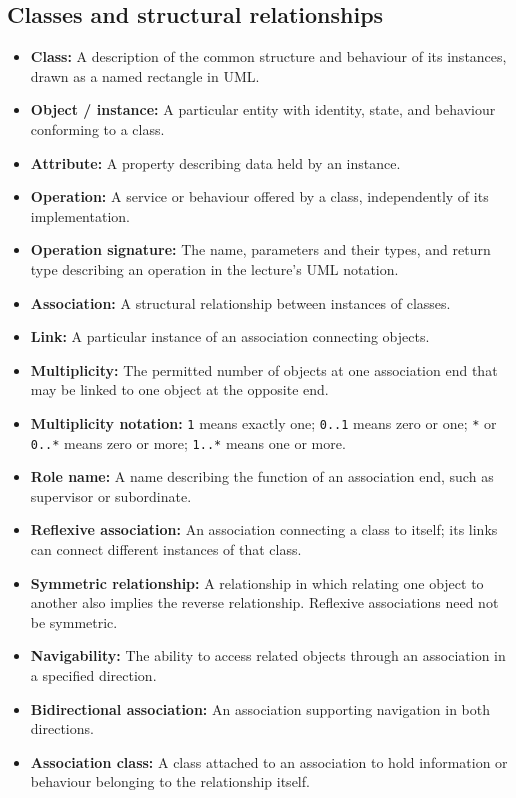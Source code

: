 \documentclass[11pt]{article}
\newenvironment{DottedList}{%
  \begin{itemize}[leftmargin=2em, itemsep=0.35em, topsep=0.35em, label=\textbullet]
}{%
  \end{itemize}
}
\begin{document}
\subsection*{Classes and structural relationships}
\begin{DottedList}
  \item \textbf{Class:} A description of the common structure and behaviour of its instances, drawn as a named rectangle in UML.
  \item \textbf{Object / instance:} A particular entity with identity, state, and behaviour conforming to a class.
  \item \textbf{Attribute:} A property describing data held by an instance.
  \item \textbf{Operation:} A service or behaviour offered by a class, independently of its implementation.
  \item \textbf{Operation signature:} The name, parameters and their types, and return type describing an operation in the lecture's UML notation.
  \item \textbf{Association:} A structural relationship between instances of classes.
  \item \textbf{Link:} A particular instance of an association connecting objects.
  \item \textbf{Multiplicity:} The permitted number of objects at one association end that may be linked to one object at the opposite end.
  \item \textbf{Multiplicity notation:} \texttt{1} means exactly one; \texttt{0..1} means zero or one; \texttt{*} or \texttt{0..*} means zero or more; \texttt{1..*} means one or more.
  \item \textbf{Role name:} A name describing the function of an association end, such as supervisor or subordinate.
  \item \textbf{Reflexive association:} An association connecting a class to itself; its links can connect different instances of that class.
  \item \textbf{Symmetric relationship:} A relationship in which relating one object to another also implies the reverse relationship. Reflexive associations need not be symmetric.
  \item \textbf{Navigability:} The ability to access related objects through an association in a specified direction.
  \item \textbf{Bidirectional association:} An association supporting navigation in both directions.
  \item \textbf{Association class:} A class attached to an association to hold information or behaviour belonging to the relationship itself.

\end{DottedList}
\end{document}
